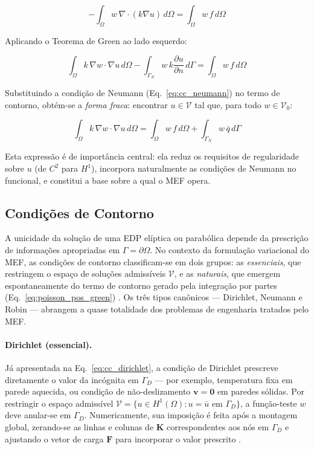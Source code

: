 \begin{equation}
-\int_\Omega w \, \nabla \cdot (k \nabla u) \, d\Omega = \int_\Omega w \, f \, d\Omega
\label{eq:poisson_pre_green}
\end{equation}

Aplicando o Teorema de Green ao lado esquerdo:

\begin{equation}
\int_\Omega k \, \nabla w \cdot \nabla u \, d\Omega - \int_{\Gamma_N} w \, k \frac{\partial u}{\partial n} \, d\Gamma = \int_\Omega w \, f \, d\Omega
\label{eq:poisson_pos_green}
\end{equation}

Substituindo a condição de Neumann (Eq.~\ref{eq:cc_neumann}) no termo de contorno, obtém-se a \textit{forma fraca}: encontrar $u \in \mathcal{V}$ tal que, para todo $w \in \mathcal{V}_0$:

\begin{equation}
\boxed{\int_\Omega k \, \nabla w \cdot \nabla u \, d\Omega = \int_\Omega w \, f \, d\Omega + \int_{\Gamma_N} w \, \bar{q} \, d\Gamma}
\label{eq:forma_fraca_poisson}
\end{equation}

Esta expressão é de importância central: ela reduz os requisitos de regularidade sobre $u$ (de $C^2$ para $H^1$), incorpora naturalmente as condições de Neumann no funcional, e constitui a base sobre a qual o MEF opera.

\subsection{Condições de Contorno}
\label{sec:condicoes_contorno}

A unicidade da solução de uma EDP elíptica ou parabólica depende da prescrição de informações apropriadas em $\Gamma = \partial\Omega$. No contexto da formulação variacional do MEF, as condições de contorno classificam-se em dois grupos: as \textit{essenciais}, que restringem o espaço de soluções admissíveis $\mathcal{V}$, e as \textit{naturais}, que emergem espontaneamente do termo de contorno gerado pela integração por partes (Eq.~\ref{eq:poisson_pos_green}) \cite{Reddy2005}. Os três tipos canônicos --- Dirichlet, Neumann e Robin --- abrangem a quase totalidade dos problemas de engenharia tratados pelo MEF.

\paragraph{Dirichlet (essencial).} Já apresentada na Eq.~\ref{eq:cc_dirichlet}, a condição de Dirichlet prescreve diretamente o valor da incógnita em $\Gamma_D$ --- por exemplo, temperatura fixa em parede aquecida, ou condição de não-deslizamento $\mathbf{v} = \mathbf{0}$ em paredes sólidas. Por restringir o espaço admissível $\mathcal{V} = \{u \in H^1(\Omega) : u = \bar{u} \text{ em } \Gamma_D\}$, a função-teste $w$ deve anular-se em $\Gamma_D$. Numericamente, sua imposição é feita após a montagem global, zerando-se as linhas e colunas de $\mathbf{K}$ correspondentes aos nós em $\Gamma_D$ e ajustando o vetor de carga $\mathbf{F}$ para incorporar o valor prescrito \cite{Zienkiewicz2013}.

